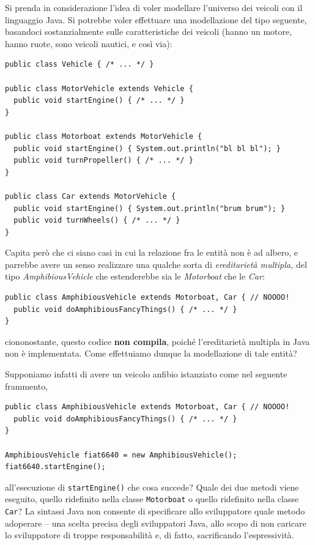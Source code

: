 \documentclass[\fontsizeclass,twocolumn]{\classname}
\theoremstyle{definition}
\theoremstyle{definition}
\begin{document}
Si prenda in considerazione l'idea di voler modellare l'universo dei veicoli
con il linguaggio Java. Si potrebbe voler effettuare una modellazione del tipo
seguente, basandoci sostanzialmente sulle caratteristiche dei veicoli (hanno un
motore, hanno ruote, sono veicoli nautici, e così via):

\begin{lstlisting}
public class Vehicle { /* ... */ }

public class MotorVehicle extends Vehicle {
  public void startEngine() { /* ... */ }
}

public class Motorboat extends MotorVehicle {
  public void startEngine() { System.out.println("bl bl bl"); }
  public void turnPropeller() { /* ... */ }
}

public class Car extends MotorVehicle {
  public void startEngine() { System.out.println("brum brum"); }
  public void turnWheels() { /* ... */ }
}
\end{lstlisting}

Capita però che ci siano casi in cui la relazione fra le entità non è ad
albero, e parrebbe avere un senso realizzare una qualche sorta di \emph{ereditarietà
multipla,} del tipo \emph{AmphibiousVehicle} che estenderebbe sia le \emph{Motorboat} che le \emph{Car}:

\begin{lstlisting}
public class AmphibiousVehicle extends Motorboat, Car { // NOOOO!
  public void doAmphibiousFancyThings() { /* ... */ }
}
\end{lstlisting}

ciononostante, questo codice \textbf{non compila}, poiché l'ereditarietà
multipla in Java non è implementata. Come effettuiamo dunque la modellazione di
tale entità?

Supponiamo infatti di avere un veicolo anfibio istanziato come nel seguente
frammento,

\begin{lstlisting}
public class AmphibiousVehicle extends Motorboat, Car { // NOOOO!
  public void doAmphibiousFancyThings() { /* ... */ }
}

AmphibiousVehicle fiat6640 = new AmphibiousVehicle();
fiat6640.startEngine();
\end{lstlisting}

all'esecuzione di \texttt{startEngine()} che cosa succede? Quale dei due metodi
viene eseguito, quello ridefinito nella classe \texttt{Motorboat} o quello
ridefinito nella classe \texttt{Car}? La sintassi Java non consente di
specificare allo sviluppatore quale metodo adoperare \--- una scelta precisa
degli sviluppatori Java, allo scopo di non caricare lo sviluppatore di troppe
responsabilità e, di fatto, sacrificando l'espressività.
\end{document}
